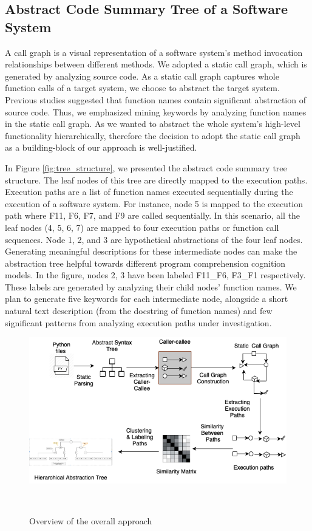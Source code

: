 \subsection{Abstract Code Summary Tree of a Software System}
A call graph is a visual representation of a software system's method invocation relationships between different methods. We adopted a static call graph, which is generated by analyzing source code. As a static call graph captures whole function calls of a target system, we choose to abstract the target system. Previous studies suggested that function names contain significant abstraction of source code. 
Thus, we emphasized mining keywords by analyzing function names in the static call graph. As we wanted to abstract the whole system's high-level functionality hierarchically, therefore the decision to adopt the static call graph as a building-block of our approach is well-justified.

In Figure \ref{fig:tree_structure}, we presented the abstract code summary tree structure. The leaf nodes of this tree are directly mapped to the execution paths. Execution paths are a list of function names executed sequentially during the execution of a software system. For instance, node 5 is mapped to the execution path where F11, F6, F7, and F9 are called sequentially. 
In this scenario, all the leaf nodes (4, 5, 6, 7) are mapped to four execution paths or function call sequences.
Node 1, 2, and 3 are hypothetical abstractions of the four leaf nodes.
Generating meaningful descriptions for these intermediate nodes can make the abstraction tree helpful towards different program comprehension cognition models.
In the figure, nodes 2, 3 have been labeled F11\_F6, F3\_F1 respectively. These labels are generated by analyzing their child nodes' function names. We plan to generate five keywords for each intermediate node, alongside a short natural text description (from the docstring of function names) and few significant patterns from analyzing execution paths under investigation.

\begin{figure}[h]
  \centering
  \includegraphics[width=\columnwidth]{figures/hla2/approach_new.png}
  \caption{Overview of the overall approach}~\label{hla2:fig:overall}
\end{figure}

